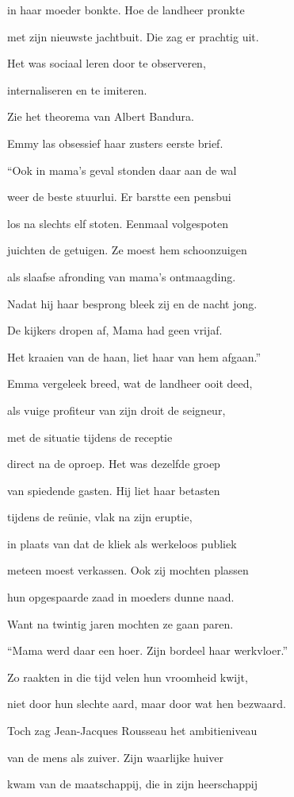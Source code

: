in haar moeder bonkte.
Hoe de landheer pronkte

met zijn nieuwste jachtbuit.
Die zag er prachtig uit.

Het was sociaal leren
door te observeren,

internaliseren
en te imiteren.

Zie het theorema
van Albert Bandura.

Emmy las obsessief
haar zusters eerste brief.

“Ook in mama’s geval
stonden daar aan de wal

weer de beste stuurlui.
Er barstte een pensbui

los na slechts elf stoten.
Eenmaal volgespoten

juichten de getuigen.
Ze moest hem schoonzuigen

als slaafse afronding
van mama’s ontmaagding.

Nadat hij haar besprong
bleek zij en de nacht jong.

De kijkers dropen af,
Mama had geen vrijaf.

Het kraaien van de haan,
liet haar van hem afgaan.”

Emma vergeleek breed,
wat de landheer ooit deed,

als vuige profiteur
van zijn droit de seigneur,

met de situatie
tijdens de receptie

direct na de oproep.
Het was dezelfde groep

van spiedende gasten.
Hij liet haar betasten

tijdens de reünie,
vlak na zijn eruptie,

in plaats van dat de kliek
als werkeloos publiek

meteen moest verkassen.
Ook zij mochten plassen

hun opgespaarde zaad
in moeders dunne naad.

Want na twintig jaren
mochten ze gaan paren.

“Mama werd daar een hoer.
Zijn bordeel haar werkvloer.”

Zo raakten in die tijd
velen hun vroomheid kwijt,

niet door hun slechte aard,
maar door wat hen bezwaard.

Toch zag Jean-Jacques Rousseau
het ambitieniveau

van de mens als zuiver.
Zijn waarlijke huiver

kwam van de maatschappij,
die in zijn heerschappij

